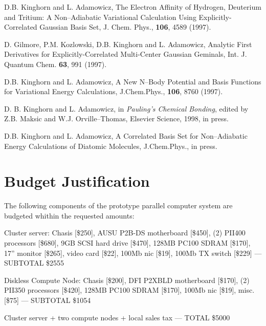 \begin{thebibliography}{999}


D.B. Kinghorn and L. Adamowicz,
The Electron Affinity of Hydrogen, Deuterium and Tritium:
A Non--Adiabatic Variational Calculation Using Explicitly-Correlated
Gaussian Basis Set, J. Chem. Phys.,
{\bf 106}, 4589 (1997).



D. Gilmore, P.M. Kozlowski, D.B. Kinghorn and
L. Adamowicz, Analytic First Derivatives for
Explicitly-Correlated Multi-Center Gaussian Geminals,
Int. J. Quantum Chem. {\bf 63}, 991 (1997).


D.B. Kinghorn and L. Adamowicz,
A New N--Body Potential and Basis Functions for
Variational Energy Calculations,
J.Chem.Phys., {\bf 106}, 8760 (1997).

D. B. Kinghorn and L. Adamowicz, in {\em Pauling's Chemical
Bonding}, edited by Z.B. Maksic and W.J. Orville--Thomas,
Elsevier Science, 1998, in press.

D.B. Kinghorn and L. Adamowicz,
A Correlated Basis Set for Non--Adiabatic Energy
Calculations of Diatomic Molecules,
J.Chem.Phys., in press.




\end{thebibliography}


\newpage


\section{Budget Justification}
The following components of the prototype parallel computer system are budgeted whithin
the requested amounts:

\noindent 
Cluster server: 
Chasis [\$250], AUSU P2B-DS motherboard [\$450], (2) PII400 processors [\$680],
9GB SCSI hard drive [\$470], 128MB PC100 SDRAM [\$170], 
17'' monitor [\$265], video card [\$22], 100Mb nic [\$19], 100Mb TX switch [\$229] --- SUBTOTAL \$2555

\noindent
Diskless Compute Node:
Chasis [\$200], DFI P2XBLD motherboard [\$170], (2) PII350 processors [\$420],
128MB PC100 SDRAM [\$170], 100Mb nic [\$19], misc. [\$75] --- SUBTOTAL \$1054

\noindent
Cluster server + two compute nodes + local sales tax --- TOTAL \$5000




